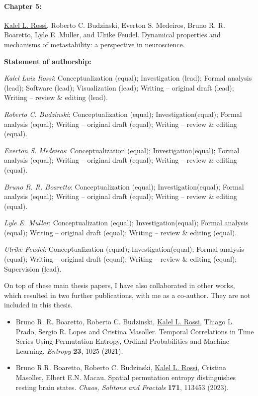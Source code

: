 \paragraph{Chapter 5:}
\underline{Kalel L. Rossi}, Roberto C. Budzinski, Everton S. Medeiros, Bruno R. R. Boaretto, Lyle E. Muller, and Ulrike Feudel. Dynamical properties and mechanisms of metastability: a perspective in neuroscience. 

{\vspace{0.3cm}\footnotesize \textbf{Statement of authorship:} %

\textit{Kalel Luiz Rossi}: Conceptualization (equal); Investigation (lead); Formal analysis (lead); Software (lead); Visualization (lead); Writing – original draft (lead); Writing – review \& editing (lead). 

\textit{Roberto C. Budzinski}: Conceptualization (equal); Investigation(equal); Formal analysis (equal); Writing – original draft (equal); Writing – review \& editing (equal).

\textit{Everton S. Medeiros}: Conceptualization (equal); Investigation(equal); Formal analysis (equal); Writing – original draft (equal); Writing – review \& editing (equal).

\textit{Bruno R. R. Boaretto}: Conceptualization (equal); Investigation(equal); Formal analysis (equal); Writing – original draft (equal); Writing – review \& editing (equal).

\textit{Lyle E. Muller}: Conceptualization (equal); Investigation(equal); Formal analysis (equal);  Writing – original draft (equal); Writing – review \& editing (equal).

\textit{Ulrike Feudel}: Conceptualization (equal); Investigation(equal); Formal analysis (equal); Writing – original draft (equal); Writing – review \& editing (equal); Supervision (lead).
}

\vspace{1cm}


On top of these main thesis papers, I have also collaborated in other works, which resulted in two further publications, with me as a co-author. They are not included in this thesis.
\begin{itemize}
    \item Bruno R. R. Boaretto, Roberto C. Budzinski, \underline{Kalel L. Rossi}, Thiago L. Prado, Sergio R. Lopes and Cristina Masoller. Temporal Correlations in Time Series Using Permutation Entropy, Ordinal Probabilities and Machine Learning. \textit{Entropy} \textbf{23}, 1025 (2021).
    \item Bruno R.R. Boaretto, Roberto C. Budzinski, \underline{Kalel L. Rossi}, Cristina Masoller, Elbert E.N. Macau. Spatial permutation entropy distinguishes resting brain states. \textit{Chaos, Solitons and Fractals} \textbf{171}, 113453 (2023).
\end{itemize}